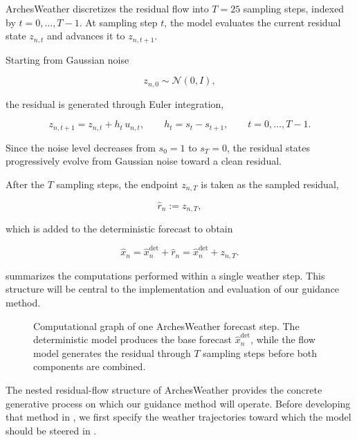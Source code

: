 ArchesWeather discretizes the residual flow into $T=25$ sampling steps,
indexed by $t=0,\ldots,T-1$. At sampling step $t$, the model evaluates the
current residual state $z_{n,t}$ and advances it to $z_{n,t+1}$.

Starting from Gaussian noise

\[
    z_{n,0}
    \sim
    \mathcal{N}(0,I),
\]

the residual is generated through Euler integration,

\begin{equation}
    z_{n,t+1}
    =
    z_{n,t}
    +
    h_t\,u_{n,t},
    \qquad
    h_t=s_t-s_{t+1},
    \qquad
    t=0,\ldots,T-1.
    \label{eq:arches-euler}
\end{equation}

Since the noise level decreases from $s_0=1$ to $s_T=0$, the residual states
progressively evolve from Gaussian noise toward a clean residual.

After the $T$ sampling steps, the endpoint $z_{n,T}$ is taken as the sampled
residual,

\begin{equation}
    \hat{r}_n
    :=
    z_{n,T},
    \label{eq:arches-sampled-residual}
\end{equation}

which is added to the deterministic forecast to obtain

\begin{equation}
    \hat{x}_n
    =
    \hat{x}^{\mathrm{det}}_n
    +
    \hat{r}_n
    =
    \hat{x}^{\mathrm{det}}_n
    +
    z_{n,T}.
    \label{eq:arches-final-forecast}
\end{equation}

 summarizes the computations performed
within a single weather step.
This structure will be central to the implementation and evaluation of our
guidance method.

\begin{figure}[H]
    \centering
    \resizebox{\textwidth}{!}{
        
    }
    \caption{
        Computational graph of one ArchesWeather forecast step.
        The deterministic model produces the base forecast
        $\hat{x}^{\mathrm{det}}_n$, while the flow model generates the
        residual through $T$ sampling steps before both components are combined.
    }
    \label{fig:arches-computational-graph}
\end{figure}

The nested residual-flow structure of ArchesWeather provides the concrete
generative process on which our guidance method will operate.
Before developing that method in , we first specify the weather
trajectories toward which the model should be steered in .